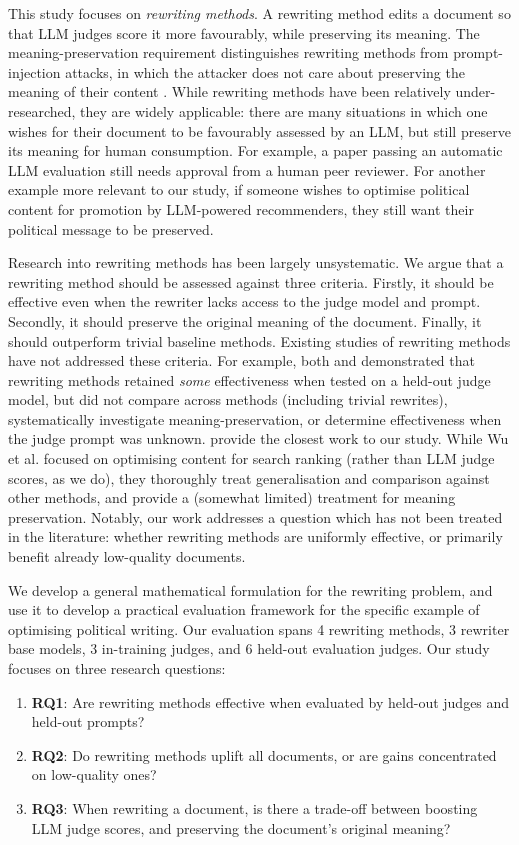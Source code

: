 \documentclass{article}
\begin{document}
This study focuses on \emph{rewriting methods}. A rewriting method edits a document so that LLM judges score it more favourably, while preserving its meaning. The meaning-preservation requirement distinguishes rewriting methods from prompt-injection attacks, in which the attacker does not care about preserving the meaning of their content \citep{liLLMsCannotReliably2025, zhengCheatingAutomaticLLM2024b}. While rewriting methods have been relatively under-researched, they are widely applicable: there are many situations in which one wishes for their document to be favourably assessed by an LLM, but still preserve its meaning for human consumption. For example, a paper passing an automatic LLM evaluation still needs approval from a human peer reviewer. For another example more relevant to our study, if someone wishes to optimise political content for promotion by LLM-powered recommenders, they still want their political message to be preserved.

Research into rewriting methods has been largely unsystematic. We argue that a rewriting method should be assessed against three criteria. Firstly, it should be effective even when the rewriter lacks access to the judge model and prompt. Secondly, it should preserve the original meaning of the document. Finally, it should outperform trivial baseline methods. Existing studies of rewriting methods have not addressed these criteria. For example, both \citet{kanekoParaphrasingAdversarialAttack2026} and \citet{panSpontaneousRewardHacking2024} demonstrated that rewriting methods retained \emph{some} effectiveness when tested on a held-out judge model, but did not compare across methods (including trivial rewrites), systematically investigate meaning-preservation, or determine effectiveness when the judge prompt was unknown. \citet{wuWhatGenerativeSearch2025} provide the closest work to our study. While Wu et al. focused on optimising content for search ranking (rather than LLM judge scores, as we do), they thoroughly treat generalisation and comparison against other methods, and provide a (somewhat limited) treatment for meaning preservation. Notably, our work addresses a question which has not been treated in the literature: whether rewriting methods are uniformly effective, or primarily benefit already low-quality documents.

We develop a general mathematical formulation for the rewriting problem, and use it to develop a practical evaluation framework for the specific example of optimising political writing. Our evaluation spans 4 rewriting methods, 3 rewriter base models, 3 in-training judges, and 6 held-out evaluation judges. Our study focuses on three research questions:
\begin{enumerate}
  \item \textbf{RQ1}: Are rewriting methods effective when evaluated by held-out judges and held-out prompts?
  \item \textbf{RQ2}: Do rewriting methods uplift all documents, or are gains concentrated on low-quality ones?
  \item \textbf{RQ3}: When rewriting a document, is there a trade-off between boosting LLM judge scores, and preserving the document's original meaning?
\end{enumerate}
\end{document}
